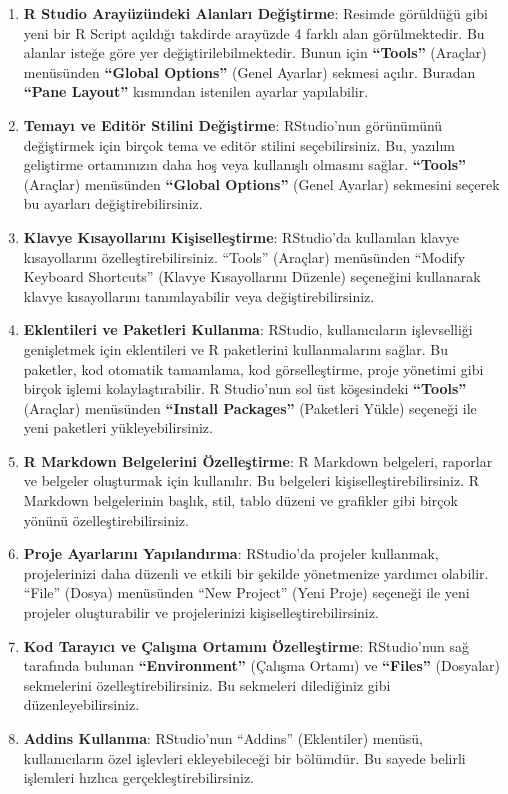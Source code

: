 \documentclass[
  letterpaper,
  DIV=11,
  numbers=noendperiod]{scrreprt}
\begin{document}
\begin{enumerate}
\def\labelenumi{\arabic{enumi}.}
\item
  \textbf{R Studio Arayüzündeki Alanları Değiştirme}: Resimde görüldüğü
  gibi yeni bir R Script açıldığı takdirde arayüzde 4 farklı alan
  görülmektedir. Bu alanlar isteğe göre yer değiştirilebilmektedir.
  Bunun için \textbf{``Tools''} (Araçlar) menüsünden \textbf{``Global
  Options''} (Genel Ayarlar) sekmesi açılır. Buradan \textbf{``Pane
  Layout''} kısmından istenilen ayarlar yapılabilir.
\item
  \textbf{Temayı ve Editör Stilini Değiştirme}: RStudio'nun görünümünü
  değiştirmek için birçok tema ve editör stilini seçebilirsiniz. Bu,
  yazılım geliştirme ortamınızın daha hoş veya kullanışlı olmasını
  sağlar. \textbf{``Tools''} (Araçlar) menüsünden \textbf{``Global
  Options''} (Genel Ayarlar) sekmesini seçerek bu ayarları
  değiştirebilirsiniz.
\item
  \textbf{Klavye Kısayollarını Kişiselleştirme}: RStudio'da kullanılan
  klavye kısayollarını özelleştirebilirsiniz. ``Tools'' (Araçlar)
  menüsünden ``Modify Keyboard Shortcuts'' (Klavye Kısayollarını
  Düzenle) seçeneğini kullanarak klavye kısayollarını tanımlayabilir
  veya değiştirebilirsiniz.
\item
  \textbf{Eklentileri ve Paketleri Kullanma}: RStudio, kullanıcıların
  işlevselliği genişletmek için eklentileri ve R paketlerini
  kullanmalarını sağlar. Bu paketler, kod otomatik tamamlama, kod
  görselleştirme, proje yönetimi gibi birçok işlemi kolaylaştırabilir. R
  Studio'nun sol üst köşesindeki \textbf{``Tools''} (Araçlar) menüsünden
  \textbf{``Install Packages''} (Paketleri Yükle) seçeneği ile yeni
  paketleri yükleyebilirsiniz.
\item
  \textbf{R Markdown Belgelerini Özelleştirme}: R Markdown belgeleri,
  raporlar ve belgeler oluşturmak için kullanılır. Bu belgeleri
  kişiselleştirebilirsiniz. R Markdown belgelerinin başlık, stil, tablo
  düzeni ve grafikler gibi birçok yönünü özelleştirebilirsiniz.
\item
  \textbf{Proje Ayarlarını Yapılandırma}: RStudio'da projeler kullanmak,
  projelerinizi daha düzenli ve etkili bir şekilde yönetmenize yardımcı
  olabilir. ``File'' (Dosya) menüsünden ``New Project'' (Yeni Proje)
  seçeneği ile yeni projeler oluşturabilir ve projelerinizi
  kişiselleştirebilirsiniz.
\item
  \textbf{Kod Tarayıcı ve Çalışma Ortamını Özelleştirme}: RStudio'nun
  sağ tarafında bulunan \textbf{``Environment''} (Çalışma Ortamı) ve
  \textbf{``Files''} (Dosyalar) sekmelerini özelleştirebilirsiniz. Bu
  sekmeleri dilediğiniz gibi düzenleyebilirsiniz.
\item
  \textbf{Addins Kullanma}: RStudio'nun ``Addins'' (Eklentiler) menüsü,
  kullanıcıların özel işlevleri ekleyebileceği bir bölümdür. Bu sayede
  belirli işlemleri hızlıca gerçekleştirebilirsiniz.
\end{enumerate}
\end{document}
